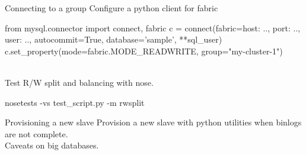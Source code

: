 \documentclass{beamer}[10]
\begin{document}
\begin{pyframe}{Connecting to a group}
Configure a python client for fabric
\begin{pycode}
from mysql.connector import connect, fabric
c = connect(fabric={host: .., port: .., user: ..},
    autocommit=True,
    database='sample', **sql_user)
c.set_property(mode=fabric.MODE_READWRITE, group="my-cluster-1")
\end{pycode}
\\
Test R/W split and balancing with nose.
\begin{bashcode}
nosetests -vs test_script.py -m rwsplit
\end{bashcode}
\end{pyframe}


\begin{pyframe}{Provisioning a new slave}
Provision a new slave with python utilities
 when binlogs are not complete. \\

 Caveats on big databases. \\
\end{pyframe}

\end{document}
